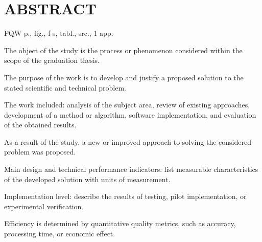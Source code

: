 \newpage
\section*{ABSTRACT}

FQW \pageref{LastPage} p.,  fig.,  f-s,  tabl.,  src., 1
app.


The object of the study is the process or phenomenon considered within the scope of the graduation thesis.

The purpose of the work is to develop and justify a proposed solution to the stated scientific and technical problem.

The work included: analysis of the subject area, review of existing approaches, development of a method or algorithm,
software implementation, and evaluation of the obtained results.

As a result of the study, a new or improved approach to solving the considered problem was proposed.

Main design and technical performance indicators: list measurable characteristics of the developed solution with units
of measurement.

Implementation level: describe the results of testing, pilot implementation, or experimental verification.

Efficiency is determined by quantitative quality metrics, such as accuracy, processing time, or economic effect.
